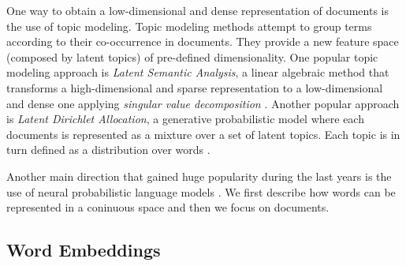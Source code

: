 


One way to obtain a low-dimensional and dense representation of documents is the use of topic modeling. Topic modeling methods attempt to group terms according to their co-occurrence in documents. They provide a new feature space (composed by latent topics) of pre-defined dimensionality. One popular topic modeling approach is \textit{Latent Semantic Analysis}, a linear algebraic method that transforms a high-dimensional and sparse representation to a low-dimensional and dense one applying \textit{singular value decomposition} . Another popular approach is \textit{Latent Dirichlet Allocation}, a generative probabilistic model where each documents is represented as a mixture over a set of latent topics. Each topic is in turn defined as a distribution over words .

Another main direction that gained huge popularity during the last years is the use of neural probabilistic language models \parencite{bengio2003neural}. We first describe how words can be represented in a coninuous space and then we focus on documents.

\subsection{Word Embeddings}

